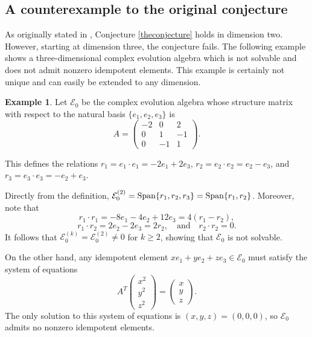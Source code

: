 \documentclass[11pt]{article}
\theoremstyle{definition}
\newtheorem{exm}[thm]{Example}
\numberwithin{equation}{section}
\begin{document}
\begin{aiblock}

\subsection*{A counterexample to the original conjecture}

As originally stated in \cite{GP26}, Conjecture \ref{theconjecture} holds in dimension two. However, starting at dimension three, the conjecture fails. The following example shows a three-dimensional complex evolution algebra which is not solvable and does not admit nonzero idempotent elements. This example is certainly not unique and can easily be extended to any dimension.


\begin{exm}Let $\mathcal E_0$ be the complex evolution algebra whose structure matrix with respect to the natural basis $\{e_1,e_2,e_3\}$ is 
\[
A = \begin{pmatrix}
    - 2 & 0 & 2 \\ 
      0 & 1 & -1 \\ 
      0 & -1 & 1
\end{pmatrix}.
\]

 \noindent This defines the relations $r_1 = e_1 \cdot e_1 = -2 e_1 + 2 e_3$, $r_2 = e_2\cdot e_2 =e_2 - e_3$, and $r_3 =  e_3\cdot e_3 = -e_2 + e_3$. 

 Directly from the definition, 
 $\mathcal E_0^{(2)} = \operatorname{Span}\{r_1, r_2, r_3\} = \operatorname{Span}\{r_1, r_2\}$. 
 Moreover, note that 
 \[
 r_1 \cdot r_1 = -8e_1 -4 e_2 +12e_3 = 4  ( r_1 - r_2),
 \]
 \[
 r_1 \cdot r_2 = 2e_2 - 2 e_3 = 2r_2,
 \quad \text{and} \quad
 r_2\cdot r_2 = 0.
 \]
 It follows that $\mathcal E_0^{(k)} = \mathcal E_0^{(2)}\neq 0$ for $k\geq 2$, showing that $\mathcal E_0$ is not solvable.

 On the other hand, any idempotent element $x e_1 + y e_2 + ze_3 \in \mathcal E_0$ must satisfy the system of equations 
 \[
 A^T
 \begin{pmatrix} 
 x^2 \\ y^2 \\ z^2
 \end{pmatrix}
 = 
 \begin{pmatrix}
         x \\ y \\ z
      \end{pmatrix}.
\] 
The only solution to this system of equations is $(x,y,z) = (0,0,0)$, so $\mathcal E_0$ admits no nonzero idempotent elements. 
\end{exm}

\end{aiblock}
\end{document}

